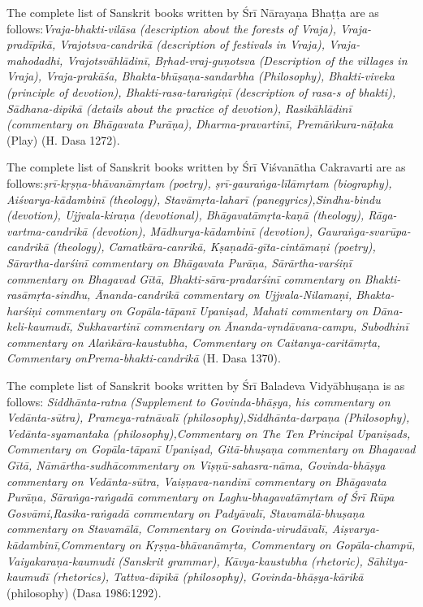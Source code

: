 {The complete list of Sanskrit books written by Śrī Nārayaṇa Bhaṭṭa are as follows:{\sl  Vraja-bhakti-vilāsa {\rm (description about the forests of Vraja)}, Vraja-pradīpikā, Vrajotsva-candrikā {\rm (description of festivals in Vraja)}, Vraja-mahodadhi, Vrajotsvāhlādinī, Bṛhad-vraj-guṇotsva {\rm (Description of the villages in Vraja)}, Vraja-prakāśa, Bhakta-bhūṣaṇa-sandarbha {\rm (Philosophy)}, Bhakti-viveka {\rm (principle of devotion)}, Bhakti-rasa-taraṅgiṇī {\rm (description of rasa-s of bhakti)}, Sādhana-dipikā {\rm (details about the practice of devotion)}, Rasikāhlādinī {\rm (commentary on Bhāgavata Purāṇa)}, Dharma-pra\-vartinī, Premāṅkura-nāṭaka} {\rm (Play)} {\rm (H. Dasa 1272)}. 

The complete list of Sanskrit books written by Śrī Viśvanātha Cakravarti are as follows:{\sl  ṣrī-kṛṣṇa-bhāvanāmṛtam {\rm (poetry)}, ṣrī-gauraṅga-līlāmṛtam {\rm (biography)}, Aiśvarya-kādambinī {\rm (theology)}, Stavāmṛta-laharī {\rm (panegyrics)},\break Sindhu-bindu {\rm (devotion)}, Ujjvala-kiraṇa  {\rm (devotional)}, Bhāgavatāmṛta-\Break kaṇā {\rm (theology)}, Rāga-vartma-candrikā {\rm (devotion)}, Mādhurya-kādambinī {\rm (devotion)}, Gauraṅga-svarūpa-candrikā {\rm (theology)}, Camatkāra-canrikā, Kṣaṇadā-gīta-cintāmaṇi {\rm (poetry)}, Sārartha-darśinī commentary on Bhāgavata Purāṇa, Sārārtha-varśiṇī commentary on Bhagavad Gītā, Bha\-kti-sāra-pradarśinī commentary on Bhakti-rasāmṛta-sindhu, Ānanda-ca\-ndri\-kā commentary on Ujjvala-Nilamaṇi, Bhakta-harśiṇi commentary on Gopāla-tāpanī Upaniṣad, Mahati commentary on Dāna-keli-kaumudī, Sukhavartinī commentary on Ānanda-vṛndāvana-campu, Subodhinī commentary on Alaṅ\-kāra-kaustubha, Commentary on Caitanya-caritāmṛta, Commentary on\break Prema-bhakti-candrikā} {\rm (H. Dasa 1370)}.} 

The complete list of Sanskrit books written by Śrī Baladeva Vidyā\-bhuṣaṇa is as follows: {\sl Siddhānta-ratna {\rm (Supplement to Govinda-bhāṣya, his commentary on Vedānta-sūtra)}, Prameya-ratnāvalī {\rm (philosophy)},\break Siddhānta-darpaṇa {\rm (Philosophy)}, Vedānta-syamantaka {\rm (philosophy)},\break Commentary on The Ten Principal Upaniṣads, Commentary on Gopāla-tāpanī Upaniṣad, Gitā-bhuṣaṇa commentary on Bhagavad Gītā, Nāmārtha-sudhā\break commentary on Viṣṇū-sahasra-nāma, Govinda-bhāṣya commentary on Vedā\-nta-sūtra, Vaiṣṇava-nandinī commentary on Bhāgavata Purāṇa, Sāraṅga-\Break raṅgadā commentary on Laghu-bhagavatāmṛtam of Śrī Rūpa Gosvāmi,\break Rasika-raṅgadā commentary on Padyāvalī, Stavamālā-bhuṣaṇa commentary on Stavamālā, Commentary on Govinda-virudāvalī, Aiṣvarya-kādambinī,\break Commentary on Kṛṣṇa-bhāvanāmṛta, Commentary on Gopāla-champū, Vai\-ya\-karaṇa-kaumudi {\rm (Sanskrit grammar)}, Kāvya-kaustubha {\rm (rhetoric)}, Sā\-hitya-kaumudī {\rm (rhetorics)}, Tattva-dīpikā {\rm (philosophy)}, Govinda-bhāṣya-\Break kārikā} {\rm (philosophy)} {\rm (Dasa 1986:1292)}. 

